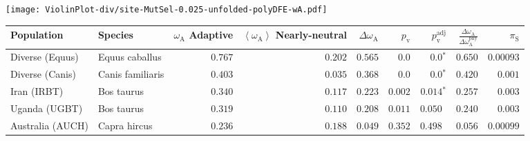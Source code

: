 \begin{center}
\texttt{[image: ViolinPlot-div/site-MutSel-0.025-unfolded-polyDFE-wA.pdf]} 
\begin{adjustbox}{width = 1\textwidth}
\begin{tabular}{|l|l|r|r|r|r|r|r|r|}
\toprule
                     Population &              Species & \specialcell{$\omega_{\mathrm{A}}$ \\ Adaptive} & \specialcell{$\left< \omega_{\mathrm{A}} \right>$ \\ Nearly-neutral} & $\Delta \omega_{\mathrm{A}} $ & $p_{\mathrm{v}}$ & $p_{\mathrm{v}}^{\mathrm{adj}}$ & $\frac{\Delta\omega_{\mathrm{A}}}{\Delta\omega_{\mathrm{A}}^{\mathrm{phy}}}$ & $\pi_{\textrm{S}}$ \\
\midrule
                Diverse (Equus) &       Equus caballus &                                        $ 0.767$ &                                           $ 0.202$ &                      $ 0.565$ &            $0.0$ &                  $\bm{0.0{^*}}$ &                                           $ 0.650$ &          $0.00093$ \\
                Diverse (Canis) &     Canis familiaris &                                        $ 0.403$ &                                           $ 0.035$ &                      $ 0.368$ &            $0.0$ &                  $\bm{0.0{^*}}$ &                                           $ 0.420$ &           $ 0.001$ \\
                    Iran (IRBT) &           Bos taurus &                                        $ 0.340$ &                                           $ 0.117$ &                      $ 0.223$ &         $ 0.002$ &               $\bm{ 0.014{^*}}$ &                                           $ 0.257$ &           $ 0.003$ \\
                  Uganda (UGBT) &           Bos taurus &                                        $ 0.319$ &                                           $ 0.110$ &                      $ 0.208$ &         $ 0.011$ &                      $ 0.050~~$ &                                           $ 0.240$ &           $ 0.003$ \\
               Australia (AUCH) &         Capra hircus &                                        $ 0.236$ &                                           $ 0.188$ &                      $ 0.049$ &         $ 0.352$ &                      $ 0.498~~$ &                                           $ 0.056$ &          $0.00099$ \\

\end{tabular}
\end{adjustbox}
\end{center}
